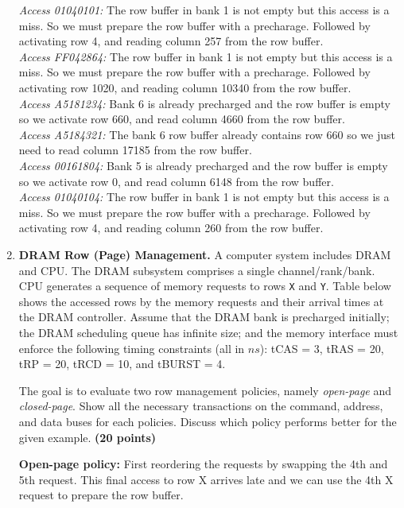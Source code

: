 \documentclass[a4paper, 11pt]{exam}
\begin{document}
\begin{enumerate}
{{\textit{Access 01040101:} The row buffer in bank 1 is not empty but this access is a miss. So we must prepare the row buffer with a precharage. Followed by activating row 4, and reading column 257 from the row buffer. \\

\textit{Access FF042864:} The row buffer in bank 1 is not empty but this access is a miss. So we must prepare the row buffer with a precharage. Followed by activating row 1020, and reading column 10340 from the row buffer. \\

\textit{Access A5181234:} Bank 6 is already precharged and the row buffer is empty so we activate row 660, and read column 4660 from the row buffer. \\

\textit{Access A5184321:} The bank 6 row buffer already contains row 660 so we just need to read column 17185 from the row buffer. \\

\textit{Access 00161804:} Bank 5 is already precharged and the row buffer is empty so we activate row 0, and read column 6148 from the row buffer. \\

\textit{Access 01040104:} The row buffer in bank 1 is not empty but this access is a miss. So we must prepare the row buffer with a precharage. Followed by activating row 4, and reading column 260 from the row buffer.
}}

\item \textbf{DRAM Row (Page) Management.}
A computer system includes DRAM and CPU.
The DRAM subsystem comprises a single channel/rank/bank.
CPU generates a sequence of memory requests to rows \texttt{X} and \texttt{Y}.
Table below shows the accessed rows by the memory requests and their arrival times at the DRAM controller.
Assume that the DRAM bank is precharged initially; the DRAM scheduling queue has infinite size; and the memory interface must enforce the following timing constraints (all in $ns$):
tCAS = 3, tRAS = 20, tRP = 20, tRCD = 10, and tBURST = 4. 

The goal is to evaluate two row management policies, namely \textit{open-page} and \textit{closed-page}.
Show all the necessary transactions on the command, address, and data buses for each policies.
Discuss which policy performs better for the given example.
\textbf{(20 points)}

\textbf{Open-page policy:} First reordering the requests by swapping the 4th and 5th request. This final access to row X arrives late and we can use the 4th X request to prepare the row buffer.


\end{enumerate}
\end{document}

